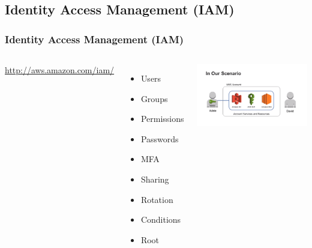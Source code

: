 \documentclass{beamer}
\begin{document}
\subsection{Identity Access Management (IAM)}
\begin{frame}[fragile]
\frametitle{Identity Access Management (IAM)}
\begin{columns}
\url{http://aws.amazon.com/iam/}
\begin{itemize}
 \item Users
 \item Groups
 \item Permissions
 \item Passwords
 \item MFA
 \item Sharing
 \item Rotation
 \item Conditions
 \item Root
\end{itemize}
\includegraphics[width= 1.0 \textwidth]{scenario.png}
\end{columns}
\end{frame}
\end{document}
